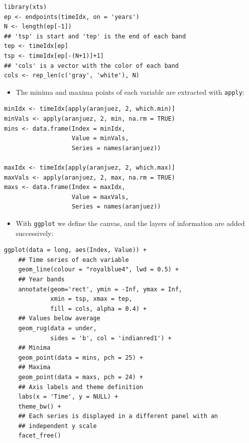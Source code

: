 \documentclass[smallroyalvopaper]{memoir}
\begin{document}
\lstset{language=r,label= ,caption= ,captionpos=b,numbers=none}
\begin{lstlisting}
library(xts)
ep <- endpoints(timeIdx, on = 'years')
N <- length(ep[-1])
## 'tsp' is start and 'tep' is the end of each band
tep <- timeIdx[ep]
tsp <- timeIdx[ep[-(N+1)]+1]
## 'cols' is a vector with the color of each band
cols <- rep_len(c('gray', 'white'), N)
\end{lstlisting}
\begin{itemize}
\item The minima and maxima points of each variable are extracted with
\texttt{apply}:
\end{itemize}
\lstset{language=r,label= ,caption= ,captionpos=b,numbers=none}
\begin{lstlisting}
minIdx <- timeIdx[apply(aranjuez, 2, which.min)]
minVals <- apply(aranjuez, 2, min, na.rm = TRUE)
mins <- data.frame(Index = minIdx,
                   Value = minVals,
                   Series = names(aranjuez))

maxIdx <- timeIdx[apply(aranjuez, 2, which.max)]
maxVals <- apply(aranjuez, 2, max, na.rm = TRUE)
maxs <- data.frame(Index = maxIdx,
                   Value = maxVals,
                   Series = names(aranjuez))
\end{lstlisting}

\begin{itemize}
\item With \texttt{ggplot} we define the canvas, and the layers of information are
added successively:
\end{itemize}
\lstset{language=r,label= ,caption= ,captionpos=b,numbers=none}
\begin{lstlisting}
ggplot(data = long, aes(Index, Value)) +
    ## Time series of each variable
    geom_line(colour = "royalblue4", lwd = 0.5) +
    ## Year bands
    annotate(geom='rect', ymin = -Inf, ymax = Inf,
             xmin = tsp, xmax = tep,
             fill = cols, alpha = 0.4) +
    ## Values below average
    geom_rug(data = under,
             sides = 'b', col = 'indianred1') +
    ## Minima
    geom_point(data = mins, pch = 25) +
    ## Maxima
    geom_point(data = maxs, pch = 24) +
    ## Axis labels and theme definition
    labs(x = 'Time', y = NULL) +
    theme_bw() +
    ## Each series is displayed in a different panel with an
    ## independent y scale
    facet_free()
\end{lstlisting}
\end{document}
